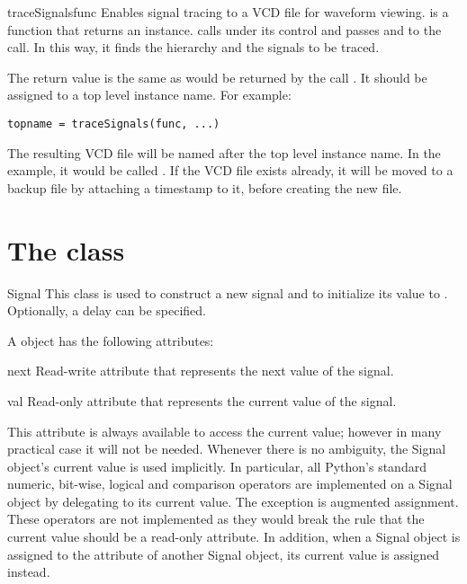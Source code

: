 \begin{funcdesc}{traceSignals}{func  }
Enables signal tracing to a VCD file for waveform viewing.
 is a function that returns an instance.
 calls  under its control
and passes  and  to the call. In this way, it
finds the hierarchy and the signals to be traced.

The return value is the same as would be returned by the call
. It should be assigned
to a top level instance name. For example:
\begin{verbatim}
topname = traceSignals(func, ...)
\end{verbatim}
The resulting VCD file will be named after the top level instance
name. In the example, it would be called .  If the
VCD file exists already, it will be moved to a backup file by
attaching a timestamp to it, before creating the new file.
\end{funcdesc}


\section{The  class \label{ref-sig}}

\begin{classdesc}{Signal}{ }
This class is used to construct a new signal and to initialize its
value to . Optionally, a delay can be specified.
\end{classdesc}

A  object has the following attributes:

\begin{memberdesc}[Signal]{next}
Read-write attribute that represents the next value of the signal.
\end{memberdesc}

\begin{memberdesc}[Signal]{val}
Read-only attribute that represents the current value of the signal.

This attribute is always available to access the current value;
however in many practical case it will not be needed. Whenever there
is no ambiguity, the Signal object's current value is used
implicitly. In particular, all Python's standard numeric, bit-wise,
logical and comparison operators are implemented on a Signal object by
delegating to its current value. The exception is augmented
assignment. These operators are not implemented as they would break
the rule that the current value should be a read-only attribute. In
addition, when a Signal object is assigned to the 
attribute of another Signal object, its current value is assigned
instead.
\end{memberdesc}


